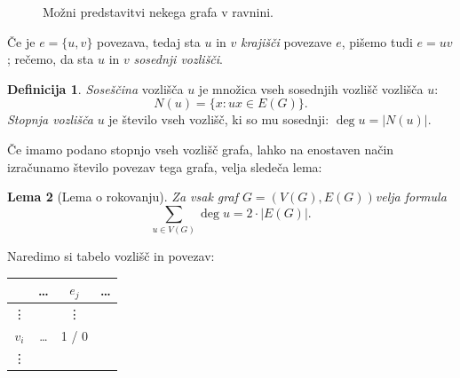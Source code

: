 \documentclass[12pt,a4paper]{amsart}
\theoremstyle{definition} %
\newtheorem{definicija}{Definicija}[section]
\theoremstyle{plain} %
\newtheorem{lema}[definicija]{Lema}
\newcommand{\graf}[1][G]{\ensuremath{#1 = (V(#1), E(#1))}}
\newcommand{\povezave}[1][G]{\ensuremath{E(#1)}}
\DeclareMathOperator {\stopnja} {deg}
\begin{document}
\begin{figure}[h]
    
    \caption{Možni predstavitvi nekega grafa v ravnini.}
\end{figure}
    
Če je $e = \{ u,v \}$ povezava, tedaj sta $u$ in $v$ \emph{krajišči} povezave $e$, pišemo tudi $e = uv$; rečemo, da sta $u$ in $v$ \emph{sosednji vozlišči}.

\begin{definicija}
	\emph{Soseščina} vozlišča $u$ je množica vseh sosednjih vozlišč vozlišča $u$:
	\[ N(u) = \{ x\colon ux \in \povezave \} .\]
	\emph{Stopnja vozlišča} $u$ je število vseh vozlišč, ki so mu sosednji: $\stopnja u = |N(u)|$.
\end{definicija}

Če imamo podano stopnjo vseh vozlišč grafa, lahko na enostaven način izračunamo število povezav tega grafa, velja sledeča lema:

\begin{lema}[Lema o rokovanju]
    \label{lema:rokovanje}
    Za vsak graf \graf velja formula
    \begin{equation}
        \sum_{u \in V(G)}\! \stopnja u = 2 \cdot |E(G)|.
        \label{eq:lema-o-rokovanju}
    \end{equation}
\end{lema}

\proof
    Naredimo si tabelo vozlišč in povezav:
    
    \begin{table}[h]
        \centering
        \begin{tabular}{c|ccc}
            & \ldots & $e_j$ & \ldots \\ \hline
            \vdots & & \vdots & \\
            $v_i$ & \ldots & 1 / 0 & \\
            \vdots & & &
        \end{tabular}
    \end{table}
    
\end{document}
